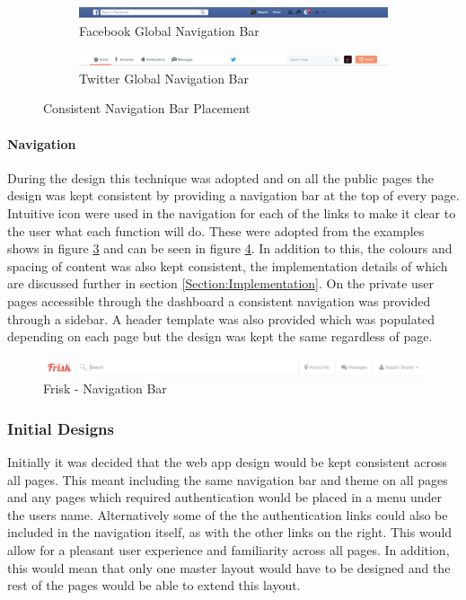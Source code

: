 \begin{figure}[H]
	\centering
	\begin{subfigure}[t]{1\textwidth}
		\centering
		\includegraphics[width=1.0\textwidth]{images/Facebook_Nav}
		\caption{Facebook Global Navigation Bar}\label{fig:Facebook_Nav}		
	\end{subfigure}
	\quad
	\begin{subfigure}[t]{1\textwidth}
		\centering
		\includegraphics[width=1.0\textwidth]{images/Twitter_Nav}
		\caption{Twitter Global Navigation Bar}\label{fig:Twitter_Nav}
	\end{subfigure}
	\caption{Consistent Navigation Bar Placement}\label{fig:Consistent_Navigation}
\end{figure}

\paragraph{Navigation} During the design this technique was adopted and on all the public pages the design was kept consistent by providing a navigation bar at the top of every page. Intuitive icon were used in the navigation for each of the links to make it clear to the user what each function will do. These were adopted from the examples shows in figure \ref{fig:Consistent_Navigation} and can be seen in figure \ref{fig:Frisk_Nav}. In addition to this, the colours and spacing of content was also kept consistent, the implementation details of which are discussed further in section \ref{Section:Implementation}. On the private user pages accessible through the dashboard a consistent navigation was provided through a sidebar. A header template was also provided which was populated depending on each page but the design was kept the same regardless of page.

\begin{figure}[H]
	\centering
	\includegraphics[width=1.0\textwidth]{images/Frisk/Frisk_Nav}
	\caption{Frisk - Navigation Bar} \label{fig:Frisk_Nav}
\end{figure}

\subsubsection{Initial Designs}
Initially it was decided that the web app design would be kept consistent across all pages. This meant including the same navigation bar and theme on all pages and any pages which required authentication would be placed in a menu under the users name. Alternatively some of the the authentication links could also be included in the navigation itself, as with the other links on the right. This would allow for a pleasant user experience and familiarity across all pages. In addition, this would mean that only one master layout would have to be designed and the rest of the pages would be able to extend this layout.

